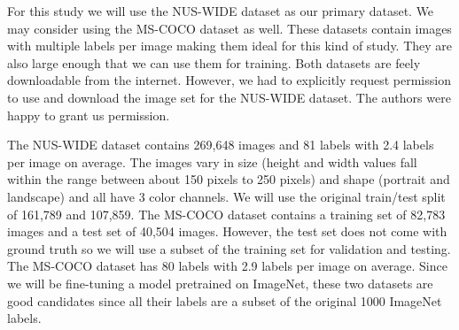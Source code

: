 \documentclass[10pt, a4paper, twocolumn]{article} %
\begin{document}
For this study we will use the NUS-WIDE\citep{nus-wide-civr09} dataset as our primary dataset. We may consider using the MS-COCO\citep{MSCOCO} dataset as well.  
These datasets contain images with multiple labels per image making them ideal for this kind of study.
They are also large enough that we can use them for training.
Both datasets are feely downloadable from the internet.  However, we had to explicitly request permission to use and download the image set for the NUS-WIDE dataset.  The authors were happy to grant us permission.

The NUS-WIDE dataset contains 269,648 images and 81 labels with 2.4 labels per image on average.  The images vary in size (height and width values fall within the range between about 150 pixels to 250 pixels) and shape (portrait and landscape) and all have 3 color channels. We will use the original train/test split of 161,789 and 107,859. The MS-COCO dataset contains a training set of 82,783 images and a test set of 40,504 images.  However, the test set does not come with ground truth so we will use a subset of the training set for validation and testing. The MS-COCO dataset has 80 labels with 2.9 labels per image on average.  
Since we will be fine-tuning a model pretrained on ImageNet, these two datasets are good candidates since all their labels are a subset of the original 1000 ImageNet labels.

\end{document}
